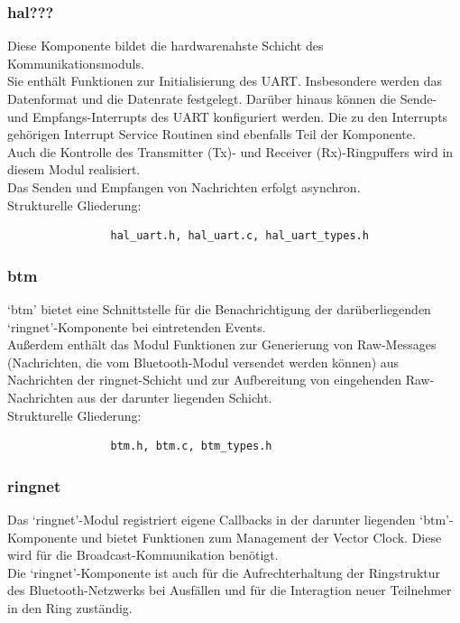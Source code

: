 \documentclass[10pt,a4paper]{article}
\begin{document}
				\subsubsection{hal???}
				Diese Komponente bildet die hardwarenahste Schicht des Kommunikationsmoduls. \\
				Sie enthält Funktionen zur Initialisierung des UART. Insbesondere werden das Datenformat und die Datenrate festgelegt.
				Darüber hinaus können die Sende- und Empfangs-Interrupts des UART konfiguriert werden. Die zu den Interrupts gehörigen Interrupt
				Service Routinen sind ebenfalls Teil der Komponente. \\
				Auch die Kontrolle des Transmitter (Tx)- und Receiver (Rx)-Ringpuffers wird in diesem Modul realisiert. \\
				Das Senden und Empfangen von Nachrichten erfolgt asynchron. \\
				
				Strukturelle Gliederung:
				\begin{verbatim}  
				hal_uart.h, hal_uart.c, hal_uart_types.h
				\end{verbatim}
				
				\subsubsection{btm}
				`btm' bietet eine Schnittstelle für die Benachrichtigung der darüberliegenden `ringnet'-Komponente bei eintretenden Events. \\
				Außerdem enthält das Modul Funktionen zur Generierung von Raw-Messages (Nachrichten, die vom Bluetooth-Modul versendet werden
				können) aus Nachrichten der ringnet-Schicht und zur Aufbereitung von eingehenden Raw-Nachrichten aus der darunter liegenden 
				Schicht. \\
				
				Strukturelle Gliederung:
				\begin{verbatim}  
				btm.h, btm.c, btm_types.h
				\end{verbatim}
				
				\subsubsection{ringnet}
				Das `ringnet'-Modul registriert eigene Callbacks in der darunter liegenden `btm'-Komponente und bietet Funktionen zum Management
				der Vector Clock. Diese wird für die Broadcast-Kommunikation benötigt. \\
				Die `ringnet'-Komponente ist auch für die Aufrechterhaltung der Ringstruktur des Bluetooth-Netzwerks bei Ausfällen und für die
				Interagtion neuer Teilnehmer in den Ring zuständig. \\
				
\end{document}
